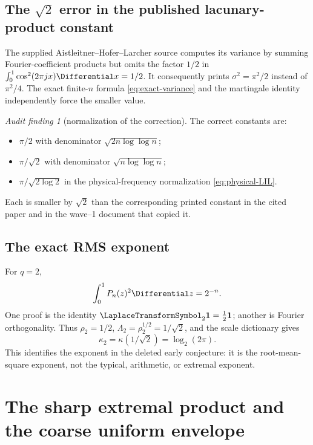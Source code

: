 \documentclass[11pt,oneside]{article}
\theoremstyle{definition}
\theoremstyle{remark}
\newtheorem{auditfinding}[theorem]{Audit finding}
\begin{document}
\subsection{The \texorpdfstring{\(\sqrt2\)}{sqrt(2)} error in the published lacunary-product constant}

The supplied Aistleitner--Hofer--Larcher source computes its variance by
summing Fourier-coefficient products but omits the factor \(1/2\) in
\(\int_0^1\cos^2(2\pi jx)\Differential x=1/2\).  It consequently prints
\(\sigma^2=\pi^2/2\) instead of \(\pi^2/4\).  The exact finite-\(n\) formula
\eqref{eq:exact-variance} and the martingale identity independently force the
smaller value.

\begin{auditfinding}[normalization of the correction]
\label{finding:LIL-correction}
The correct constants are:
\begin{itemize}
\item \(\pi/2\) with denominator \(\sqrt{2n\log\log n}\);
\item \(\pi/\sqrt2\) with denominator \(\sqrt{n\log\log n}\);
\item \(\pi/\sqrt{2\log2}\) in the physical-frequency normalization
\eqref{eq:physical-LIL}.
\end{itemize}
Each is smaller by \(\sqrt2\) than the corresponding printed constant in the
cited paper and in the wave--1 document that copied it.
\end{auditfinding}

\subsection{The exact RMS exponent}

For \(q=2\),
\begin{equation}
 \int_0^1P_n(z)^2\Differential z=2^{-n}.
 \label{eq:Pn-L2}
\end{equation}
One proof is the identity \(\LaplaceTransformSymbol_2\mathbf1=\tfrac12\mathbf1\); another is
Fourier orthogonality.  Thus \(\rho_2=1/2\),
\(\Lambda_2=\rho_2^{1/2}=1/\sqrt2\), and the scale dictionary gives
\begin{equation}
 \kappa_2=\kappa(1/\sqrt2)=\log_2(2\pi).
 \label{eq:kappa2}
\end{equation}
This identifies the exponent in the deleted early conjecture: it is the
root-mean-square exponent, not the typical, arithmetic, or extremal exponent.

\section{The sharp extremal product and the coarse uniform envelope}
\label{sec:extremal}
\end{document}
